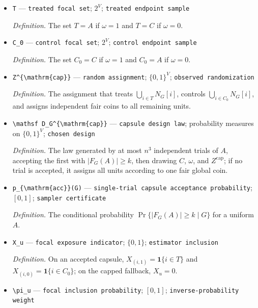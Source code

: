 \documentclass{article}
\begin{document}
\begin{itemize}
  \item \texttt{T} --- \texttt{treated focal set}; \(2^V\); \texttt{treated endpoint sample}
  \par\smallskip\noindent\emph{Definition.} The set \(T=A\) if \(\omega=1\) and \(T=C\) if \(\omega=0\).
  \item \texttt{C\_\allowbreak{}0} --- \texttt{control focal set}; \(2^V\); \texttt{control endpoint sample}
  \par\smallskip\noindent\emph{Definition.} The set \(C_0=C\) if \(\omega=1\) and \(C_0=A\) if \(\omega=0\).
  \item \texttt{Z\textasciicircum{}\{\textbackslash{}\allowbreak{}mathrm\{cap\}\allowbreak{}\}\allowbreak{}} --- \texttt{random assignment}; \(\{0,1\}^V\); \texttt{observed randomization}
  \par\smallskip\noindent\emph{Definition.} The assignment that treats \(\bigcup_{i\in T}N_G[i]\), controls \(\bigcup_{i\in C_0}N_G[i]\), and assigns independent fair coins to all remaining units.
  \item \texttt{\textbackslash{}\allowbreak{}mathsf D\_\allowbreak{}G\textasciicircum{}\{\textbackslash{}\allowbreak{}mathrm\{cap\}\allowbreak{}\}\allowbreak{}} --- \texttt{capsule design law}; probability measures on \(\{0,1\}^V\); \texttt{chosen design}
  \par\smallskip\noindent\emph{Definition.} The law generated by at most \(n^3\) independent trials of \(A\), accepting the first with \(|F_G(A)|\ge k\), then drawing \(C\), \(\omega\), and \(Z^{\mathrm{cap}}\); if no trial is accepted, it assigns all units according to one fair global coin.
  \item \texttt{p\_\allowbreak{}\{\textbackslash{}\allowbreak{}mathrm\{acc\}\allowbreak{}\}\allowbreak{}(G)} --- \texttt{single-\allowbreak{}trial capsule acceptance probability}; \([0,1]\); \texttt{sampler certificate}
  \par\smallskip\noindent\emph{Definition.} The conditional probability \(\Pr\{|F_G(A)|\ge k\mid G\}\) for a uniform \(A\).
  \item \texttt{X\_\allowbreak{}u} --- \texttt{focal exposure indicator}; \(\{0,1\}\); \texttt{estimator inclusion}
  \par\smallskip\noindent\emph{Definition.} On an accepted capsule, \(X_{(i,1)}=\mathbf 1\{i\in T\}\) and \(X_{(i,0)}=\mathbf 1\{i\in C_0\}\); on the capped fallback, \(X_u=0\).
  \item \texttt{\textbackslash{}\allowbreak{}pi\_\allowbreak{}u} --- \texttt{focal inclusion probability}; \([0,1]\); \texttt{inverse-\allowbreak{}probability weight}

\end{itemize}
\end{document}
